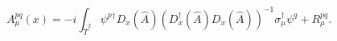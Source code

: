 \begin{equation}\label{t2R}
A_\mu^{pq}(x)
=-i \int_{\tilde T^2}  
\psi^p{}^\dagger 
D_x(\hat A)\left(D_x^\dagger(\hat A)D_x(\hat A)\right)^{-1}
\sigma^\dagger_\mu\psi^q +R_\mu^{pq}.
\end{equation}

